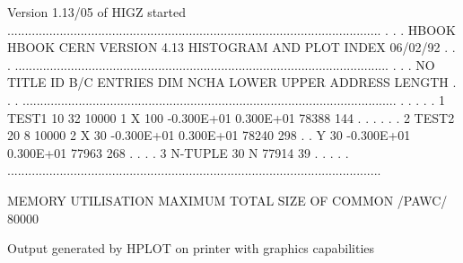 \begin{Listing}
Version 1.13/05 of HIGZ started
...........................................................................................................
.                                                                                                         .
.   HBOOK   HBOOK  CERN    VERSION   4.13     HISTOGRAM AND PLOT INDEX                     06/02/92       .
.                                                                                                         .
...........................................................................................................
.                                                                                                         .
.  NO            TITLE             ID  B/C  ENTRIES DIM   NCHA     LOWER       UPPER       ADDRESS LENGTH .
.                                                                                                         .
...........................................................................................................
.                                                                                                         .
.                                                                                                         .
.   1  TEST1                       10  32    10000  1  X   100  -0.300E+01   0.300E+01       78388    144 .
.                                                                                                         .
.                                                                                                         .
.   2  TEST2                       20   8    10000  2  X    30  -0.300E+01   0.300E+01       78240    298 .
.                                                      Y    30  -0.300E+01   0.300E+01       77963    268 .
.                                                                                                         .
.   3  N-TUPLE                     30               N                                        77914     39 .
.                                                                                                         .
.                                                                                                         .
...........................................................................................................

 MEMORY UTILISATION
      MAXIMUM TOTAL SIZE OF COMMON /PAWC/            80000
\end{Listing}
\begin{center}
Output generated by HPLOT on printer with graphics capabilities
\end{center}


